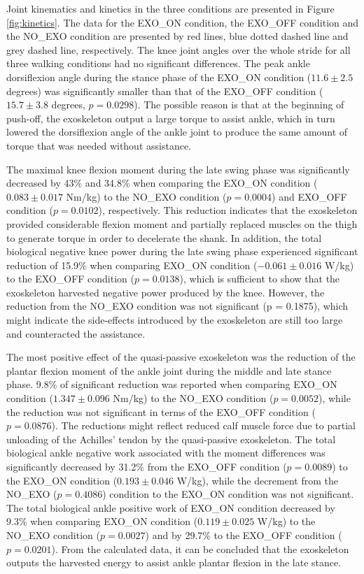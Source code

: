 \documentclass[twocolumn,cleanfoot,10pt]{asme2ej}
\begin{document}
Joint kinematics and kinetics in the three conditions are presented in Figure \ref{fig:kinetics}. The data for the EXO\_ON condition, the EXO\_OFF condition and the NO\_EXO condition are presented by red lines, blue dotted dashed line and grey dashed line, respectively. The knee joint angles over the whole stride for all three walking conditions had no significant differences. The peak ankle dorsiflexion angle during the stance phase of the EXO\_ON condition ($11.6\pm2.5$ degrees) was significantly smaller than that of the EXO\_OFF condition ($15.7\pm3.8$ degrees, $p=0.0298$). The possible reason is that at the beginning of push-off, the exoskeleton output a large torque to assist ankle, which in turn lowered the dorsiflexion angle of the ankle joint to produce the same amount of torque that was needed without assistance. 

The maximal knee flexion moment during the late swing phase was significantly decreased by 43\% and 34.8\% when comparing the EXO\_ON condition ($0.083\pm0.017$ Nm/kg) to the NO\_EXO condition ($p = 0.0004$) and EXO\_OFF condition ($p = 0.0102$), respectively. This reduction indicates that the exoskeleton provided considerable flexion moment and partially replaced muscles on the thigh to generate torque in order to decelerate the shank. In addition, the total biological negative knee power during the late swing phase experienced significant reduction of 15.9\% when comparing EXO\_ON condition ($-0.061\pm0.016$ W/kg) to the EXO\_OFF condition ($p = 0.0138$), which is sufficient to show that the exoskeleton harvested negative power produced by the knee. However, the reduction from the NO\_EXO condition was not significant (p = 0.1875), which might indicate the side-effects introduced by the exoskeleton are still too large and counteracted the assistance.


The most positive effect of the quasi-passive exoskeleton was the reduction of the plantar flexion moment of the ankle joint during the middle and late stance phase. 9.8\% of significant reduction was reported when comparing EXO\_ON condition ($1.347\pm0.096$ Nm/kg) to the NO\_EXO condition ($p = 0.0052$), while the reduction was not significant in terms of the EXO\_OFF condition ($p = 0.0876$). The reductions might reflect reduced calf muscle force due to partial unloading of the Achilles’ tendon by the quasi-passive exoskeleton. The total biological ankle negative work associated with the moment differences was significantly decreased by 31.2\% from the EXO\_OFF condition ($p = 0.0089$) to the EXO\_ON condition ($0.193\pm0.046$ W/kg), while the decrement from the NO\_EXO ($p = 0.4086$) condition to the EXO\_ON condition was not significant. The total biological ankle positive work of EXO\_ON condition decreased by 9.3\% when comparing EXO\_ON condition ($0.119\pm0.025$ W/kg) to the NO\_EXO condition ($p = 0.0027$) and by 29.7\% to the EXO\_OFF condition ($p = 0.0201$). From the calculated data, it can be concluded that the exoskeleton outputs the harvested energy to assist ankle plantar flexion in the late stance. 
\end{document}
